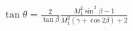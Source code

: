 \documentclass[10pt]{article}
\begin{document}
\begin{align*}\tan \theta 
=
\frac{2}{ \tan \beta}
\frac{
 M_{1}^{2} \sin^2 \beta - 1
}
{
M_{1}^{2} \left( \gamma + \cos 2 \beta \right) + 2
}\end{align*}
\end{document}
